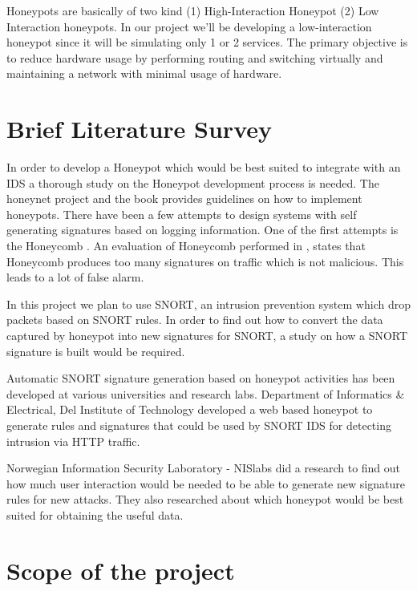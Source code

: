 \documentclass[conference]{IEEEtran}
\begin{document}
Honeypots are basically of two kind (1) High-Interaction Honeypot (2) Low Interaction honeypots. In our project we'll be developing a low-interaction honeypot since it will be simulating only 1 or 2 services.
The primary objective is to reduce hardware usage by performing routing and switching virtually and maintaining a network with minimal usage of hardware.

\section{Brief Literature Survey}
In order to develop a Honeypot which would be best suited to integrate with an IDS a thorough study on the Honeypot development process is needed. The honeynet project \cite{b3} and the book \cite{b4} provides guidelines on how to implement honeypots. There have been a few attempts to design systems with self generating signatures based on logging information. One of the first attempts is the Honeycomb \cite{b5}. An evaluation of Honeycomb performed in \cite{b6}, states that Honeycomb produces too many signatures on traffic which is not malicious. This leads to a lot of false alarm.

In this project we plan to use SNORT, an intrusion prevention system which drop packets based on SNORT rules. In order to find out how to convert the data captured by honeypot into new signatures for SNORT, a study on how a SNORT \cite{b7} signature is built would be required.

Automatic SNORT signature generation based on honeypot activities has been developed at various universities and research labs. Department of Informatics & Electrical, Del Institute of Technology \cite{b8} developed a web based honeypot to generate rules and signatures that could be used by SNORT IDS for detecting intrusion via HTTP traffic.

Norwegian Information Security Laboratory - NISlabs \cite{b9} did a research to find out how much user interaction would be needed to be able to generate new signature rules for new attacks. They also researched about which honeypot would be best suited for obtaining the useful data.

\section{Scope of the project}
\end{document}
